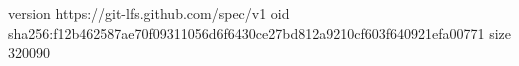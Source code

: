version https://git-lfs.github.com/spec/v1
oid sha256:f12b462587ae70f09311056d6f6430ce27bd812a9210cf603f640921efa00771
size 320090
